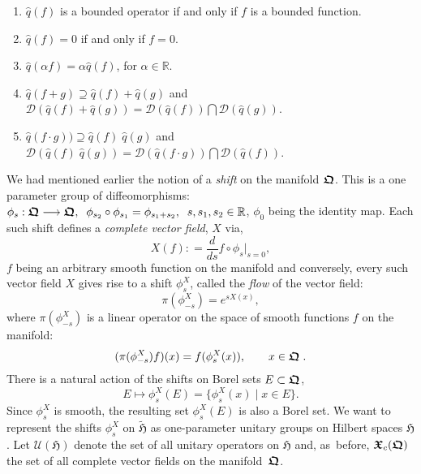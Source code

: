 \documentclass[11pt]{amsart}
\numberwithin{equation}{section}
\theoremstyle{remark}
\newcommand\HH{\mathfrak H}
\newcommand{\be}{\begin{equation}}
\newcommand{\en}{\end{equation}}
\newcommand{\htil}{\widetilde{\mathfrak H}}
\newcommand{\bfrakQ}{\mbox{\boldmath $\mathfrak Q$}}
\newcommand{\bfrakX}{\mbox{\boldmath $\mathfrak X$}}
\begin{document}
\begin{enumerate}

\item $\widehat q (f)$ is a bounded operator if and only if $f$ is a bounded
function.

\item $\widehat q (f) = 0$ if and only if $f = 0$.

\item $\widehat q (\alpha f) = \alpha \widehat q (f)$, for
$\alpha \in \mathbb R$.

\item $\widehat q (f + g )   \supseteq \widehat q (f)  +\widehat q (g)$ and
      ${\mathcal D}(\widehat q (f) + \widehat q (g))
 = {\mathcal D}(\widehat q (f)) \bigcap {\mathcal D}(\widehat q (g))$.


\item $\widehat q (f\cdot g)) \supseteq \widehat q (f)\;\widehat q (g)$ and
      ${\mathcal D}(\widehat q (f)\;\widehat q (g)) =
      {\mathcal D}(\widehat q (f\cdot g ))\bigcap{\mathcal D}(\widehat q (f))$.

\end{enumerate}

We had mentioned earlier the notion of a {\em shift} on the manifold $\bfrakQ$.
This is a one parameter group of diffeomorphisms:
$\phi_s : \bfrakQ \longrightarrow \bfrakQ, \;\;
\phi_{s_2}\circ\phi_{s_1} = \phi_{s_1 + s_2}, \;\; s, s_1 , s_2 \in \mathbb R$,
$\phi_0$ being the identity map. Each such shift defines a {\em complete vector
field\/}, $X$ via,
\be
   X(f) : = \frac d{ds} f\circ \phi_s \vert_{s=0} ,
\label{vectfield1}
\en
$f$ being an arbitrary smooth function on the manifold and conversely,
every such vector field $X$ gives rise to a shift $\phi^X_s$, called the
{\em flow} of the vector field:
\be
   \pi(\phi^X_{-s} ) = e^{sX(x)},
\label{vectfield2}
\en
where $\pi(\phi^X_{-s} )$ is a linear operator on the space of smooth functions
$f$ on the manifold:
\be
  (\pi(\phi^X_{-s} )f)(x) = f(\phi^X_{s}(x)), \qquad x \in \bfrakQ\; .
\label{morevectfield}
\en
There is a natural action of the shifts on Borel sets $E \subset \bfrakQ$,
\be
   E \longmapsto \phi^X_s (E) = \{ \phi^X_s (x) \;\vert\; x \in E\} .
\label{shift}
\en
Since $\phi^X_s$ is smooth, the resulting set $\phi^X_s (E)$ is also a Borel
set. We want to represent the shifts $\phi^X_s$ on $\htil$ as one-parameter
unitary groups on Hilbert spaces $\HH$. Let ${\mathcal U}(\HH )$ denote the set
of all unitary operators on $\HH$ and, as~before, ${\bfrakX}_c (\bfrakQ )$ the
set of all complete vector fields on the manifold~$\bfrakQ$.
\end{document}
